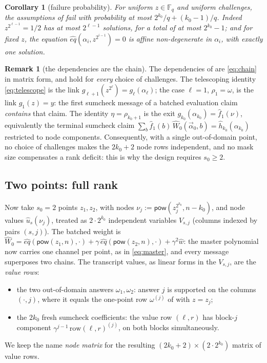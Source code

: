 \documentclass{article}
\newcommand{\Fq}{\mathbb{F}_q}
\newcommand{\pow}{\mathsf{pow}}
\newtheorem{corollary}[theorem]{Corollary}
\theoremstyle{definition}
\newtheorem{remark}[theorem]{Remark}
\begin{document}
\begin{corollary}[failure probability]\label{cor:rankprob}
For uniform $z \in \Fq$ and uniform challenges, the assumptions of  fail with probability at most $2^{k_0}/q + (k_0 - 1)/q$. Indeed $z^{2^{\ell - 1}} = 1/2$ has at most $2^{\ell-1}$ solutions, for a total of at most $2^{k_0} - 1$; and for fixed $z$, the equation $\hat{eq}(\alpha_i, z^{2^{i-1}}) = 0$ is affine non-degenerate in $\alpha_i$, with exactly one solution.
\end{corollary}

\begin{remark}[the dependencies are the chain]\label{rem:identities}
The dependencies of  are \cref{eq:chain} in matrix form, and hold for \emph{every} choice of challenges. The telescoping identity \cref{eq:telescope} is the link $g_{\ell+1}(z^{2^{\ell}}) = g_\ell(\alpha_\ell)$; the case $\ell = 1$, $\rho_1 = \omega$, is the link $g_1(z) = y$: the first sumcheck message of a batched evaluation claim \emph{contains} that claim. The identity $\eta = \rho_{k_0+1}$ is the exit $g_{k_0}(\alpha_{k_0}) = \hat{f}_1(\nu)$, equivalently the terminal sumcheck claim $\sum_b \hat{f}_1(b)\, \hat{W}_0(\vec{\alpha}_0, b) = \hat{h}_{k_0}(\alpha_{k_0})$ restricted to node components. Consequently, with a single out-of-domain point, no choice of challenges makes the $2k_0 + 2$ node rows independent, and no mask size compensates a rank deficit: this is why the design requires $s_0 \geq 2$.
\end{remark}

\subsection{Two points: full rank}\label{sec:twopoint}

Now take $s_0 = 2$ points $z_1, z_2$, with nodes $\nu_j := \pow(z_j^{2^{k_0}}, n - k_0)$, and node values $\hat{u}_s(\nu_j)$, treated as $2 \cdot 2^{k_0}$ independent variables $V_{s,j}$ (columns indexed by pairs $(s, j)$). The batched weight is $\hat{W}_0 = \hat{eq}(\pow(z_1, n), \cdot) + \gamma\, \hat{eq}(\pow(z_2, n), \cdot) + \gamma^2 \hat{w}$: the master polynomial now carries one channel per point, as in \cref{eq:master}, and every message superposes two chains. The transcript values, as linear forms in the $V_{s,j}$, are the \emph{value rows}:
\begin{itemize}
    \item the two out-of-domain answers $\omega_1, \omega_2$: answer $j$ is supported on the columns $(\cdot, j)$, where it equals the one-point row $\omega^{(j)}$ of  with $z = z_j$;
    \item the $2k_0$ fresh sumcheck coefficients: the value row $(\ell, r)$ has block-$j$ component $\gamma^{j-1}\, \mathrm{row}(\ell, r)^{(j)}$, on both blocks simultaneously.
\end{itemize}
We keep the name \emph{node matrix} for the resulting $(2k_0 + 2) \times (2 \cdot 2^{k_0})$ matrix of value rows.
\end{document}
